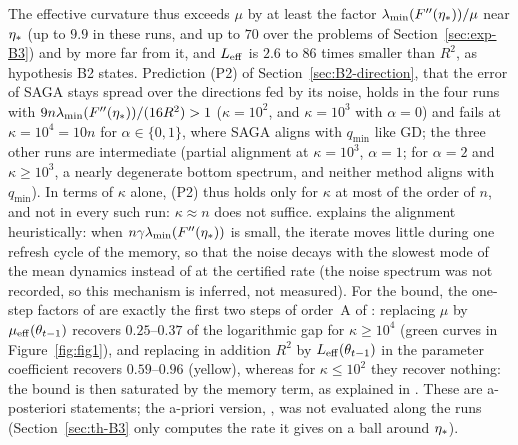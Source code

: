 The effective curvature thus exceeds $\mu$ by at least the factor $\lambda_{\min}(F''(\eta_\ast))/\mu$ near $\eta_\ast$ (up to $9.9$
in these runs, and up to $70$ over the problems of Section~\ref{sec:exp-B3}) and by more far from it, and $L_{\mathrm{eff}}$ is $2.6$
to $86$ times smaller than $R^2$, as hypothesis B2 states. Prediction (P2) of Section~\ref{sec:B2-direction}, that the
error of SAGA stays spread over the directions fed by its noise, holds in the four runs with
$9n\lambda_{\min}(F''(\eta_\ast))/(16R^2)>1$ ($\kappa=10^2$, and $\kappa=10^3$ with $\alpha=0$) and fails at $\kappa=10^4=10n$ for
$\alpha\in\{0,1\}$, where SAGA aligns with $q_{\min}$ like GD; the three other runs are intermediate (partial alignment at
$\kappa=10^3$, $\alpha=1$; for $\alpha=2$ and $\kappa\ge10^3$, a nearly degenerate bottom spectrum, and neither method
aligns with $q_{\min}$). In terms of $\kappa$ alone, (P2) thus holds only for $\kappa$ at most of the order of $n$, and not in every such
run: $\kappa\approx n$ does not suffice.  explains the alignment heuristically: when
$n\gamma\lambda_{\min}(F''(\eta_\ast))$ is small, the iterate moves little during one refresh cycle of the memory, so that the noise
decays with the slowest mode of the mean dynamics instead of at the certified rate (the noise spectrum was not recorded,
so this mechanism is inferred, not measured). For the bound, the one-step factors of  are exactly the
first two steps of order~A of : replacing $\mu$ by $\mu_{\mathrm{eff}}(\theta_{t-1})$ recovers
$0.25$--$0.37$ of the logarithmic gap for $\kappa\ge10^4$ (green curves in Figure~\ref{fig:fig1}), and replacing in
addition $R^2$ by $L_{\mathrm{eff}}(\theta_{t-1})$ in the parameter coefficient recovers $0.59$--$0.96$ (yellow), whereas for
$\kappa\le10^2$ they recover nothing: the bound is then saturated by the memory term, as explained in
. These are a-posteriori statements; the a-priori version, , was not
evaluated along the runs (Section~\ref{sec:th-B3} only computes the rate it gives on a ball around $\eta_\ast$).

